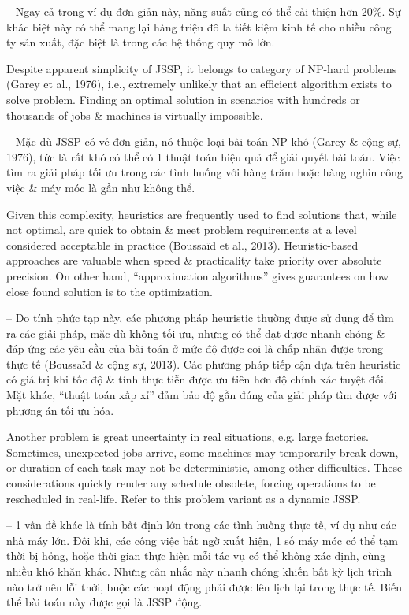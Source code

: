 \documentclass{article}
\begin{document}
\begin{itemize}
    -- Ngay cả trong ví dụ đơn giản này, năng suất cũng có thể cải thiện hơn 20\%. Sự khác biệt này có thể mang lại hàng triệu đô la tiết kiệm kinh tế cho nhiều công ty sản xuất, đặc biệt là trong các hệ thống quy mô lớn.

    Despite apparent simplicity of JSSP, it belongs to category of NP-hard problems (Garey et al., 1976), i.e., extremely unlikely that an efficient algorithm exists to solve problem. Finding an optimal solution in scenarios with hundreds or thousands of jobs \& machines is virtually impossible.

    -- Mặc dù JSSP có vẻ đơn giản, nó thuộc loại bài toán NP-khó (Garey \& cộng sự, 1976), tức là rất khó có thể có 1 thuật toán hiệu quả để giải quyết bài toán. Việc tìm ra giải pháp tối ưu trong các tình huống với hàng trăm hoặc hàng nghìn công việc \& máy móc là gần như không thể.

    Given this complexity, heuristics are frequently used to find solutions that, while not optimal, are quick to obtain \& meet problem requirements at a level considered acceptable in practice (Boussaïd et al., 2013). Heuristic-based approaches are valuable when speed \& practicality take priority over absolute precision. On other hand, ``approximation algorithms'' gives guarantees on how close found solution is to the optimization.

    -- Do tính phức tạp này, các phương pháp heuristic thường được sử dụng để tìm ra các giải pháp, mặc dù không tối ưu, nhưng có thể đạt được nhanh chóng \& đáp ứng các yêu cầu của bài toán ở mức độ được coi là chấp nhận được trong thực tế (Boussaïd \& cộng sự, 2013). Các phương pháp tiếp cận dựa trên heuristic có giá trị khi tốc độ \& tính thực tiễn được ưu tiên hơn độ chính xác tuyệt đối. Mặt khác, ``thuật toán xấp xỉ'' đảm bảo độ gần đúng của giải pháp tìm được với phương án tối ưu hóa.

    Another problem is great uncertainty in real situations, e.g. large factories. Sometimes, unexpected jobs arrive, some machines may temporarily break down, or duration of each task may not be deterministic, among other difficulties. These considerations quickly render any schedule obsolete, forcing operations to be rescheduled in real-life. Refer to this problem variant as a dynamic JSSP.

    -- 1 vấn đề khác là tính bất định lớn trong các tình huống thực tế, ví dụ như các nhà máy lớn. Đôi khi, các công việc bất ngờ xuất hiện, 1 số máy móc có thể tạm thời bị hỏng, hoặc thời gian thực hiện mỗi tác vụ có thể không xác định, cùng nhiều khó khăn khác. Những cân nhắc này nhanh chóng khiến bất kỳ lịch trình nào trở nên lỗi thời, buộc các hoạt động phải được lên lịch lại trong thực tế. Biến thể bài toán này được gọi là JSSP động.


\end{itemize}
\end{document}
